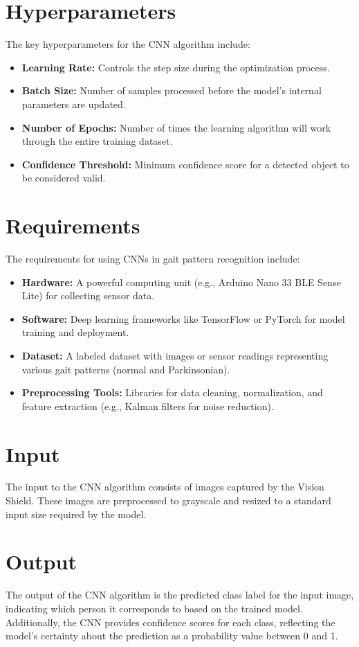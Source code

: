 \section{Hyperparameters}
The key hyperparameters for the CNN algorithm \cite{MNISTCNNgit:2023} include:

\begin{itemize}
	\item \textbf{Learning Rate:} Controls the step size during the optimization process. 
	\item \textbf{Batch Size:} Number of samples processed before the model’s internal parameters are updated.
	\item \textbf{Number of Epochs:} Number of times the learning algorithm will work through the entire training dataset.
	\item \textbf{Confidence Threshold:} Minimum confidence score for a detected object to be considered valid.
\end{itemize}

\section{Requirements}
The requirements for using CNNs in gait pattern recognition include:

\begin{itemize}
	\item \textbf{Hardware:} A powerful computing unit (e.g., Arduino Nano 33 BLE Sense Lite) for collecting sensor data.
	\item \textbf{Software:} Deep learning frameworks like TensorFlow or PyTorch for model training and deployment.
	\item \textbf{Dataset:} A labeled dataset with images or sensor readings representing various gait patterns (normal and Parkinsonian).
	\item \textbf{Preprocessing Tools:} Libraries for data cleaning, normalization, and feature extraction (e.g., Kalman filters for noise reduction).
\end{itemize}

\section{Input}
The input to the CNN algorithm consists of images captured by the Vision Shield. These images are preprocessed to grayscale and resized to a standard input size required by the model.

\section{Output}
The output of the CNN algorithm is the predicted class label for the input image, indicating which person it corresponds to based on the trained model. Additionally, the CNN provides confidence scores for each class, reflecting the model’s certainty about the prediction as a probability value between 0 and 1.

